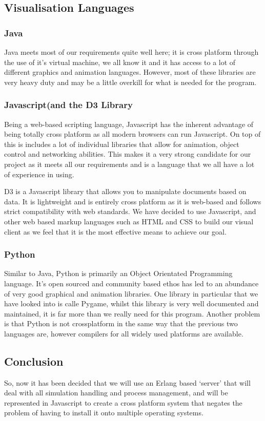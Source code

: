 \subsection{Visualisation Languages}
\subsubsection{Java}
Java meets most of our requirements quite well here; it is cross platform through the use of it’s virtual machine, we all know it and it has access to a lot of different graphics and animation languages. However, most of these libraries are very heavy duty and may be a little overkill for what is needed for the program.
\subsubsection{Javascript(and the D3 Library}
Being a web-based scripting language, Javascript has the inherent advantage of being totally cross platform as all modern browsers can run Javascript. On top of this is includes a lot of individual libraries that allow for animation, object control and networking abilities. This makes it a very strong candidate for our project as it meets all our requirements and is a language that we all have a lot of experience in using.

D3 is a Javascript library that allows you to manipulate documents based on data. It is lightweight and is entirely cross platform as it is web-based and follows strict compatibility with web standards. We have decided to use Javascript, and other web based markup languages such as HTML and CSS to build our visual client as we feel that it is the most effective means to achieve our goal.
\subsubsection{Python}
Similar to Java, Python is primarily an Object Orientated Programming language. It’s open sourced and community based ethos has led to an abundance of very good graphical and animation libraries. One library in particular that we have looked into is calle Pygame, whilst this library is very well documented and maintained, it is far more than we really need for this program. Another problem is that Python is not crossplatform in the same way that the previous two languages are, however compilers for all widely used platforms are available.
\subsection{Conclusion}
So, now it has been decided that we will use an Erlang based ‘server’ that will deal with all simulation handling and process management, and will be represented in Javascript to create a cross platform system that negates the problem of having to install it onto multiple operating systems.
\clearpage
\endinput
